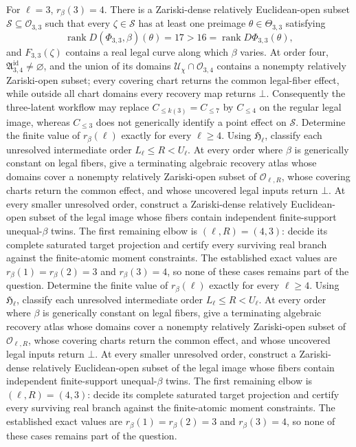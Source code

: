 For \(\ell=3\), \(r_\beta(3)=4\).  There is a Zariski-dense relatively Euclidean-open subset \(\mathcal S\subseteq\mathcal O_{3,3}\) such that every \(\zeta\in\mathcal S\) has at least one preimage \(\theta\in\Theta_{3,3}\) satisfying
\[
 \operatorname{rank}D(\Phi_{3,3},\beta)(\theta)=17
 >16=\operatorname{rank}D\Phi_{3,3}(\theta),
\]
and \(F_{3,3}(\zeta)\) contains a real legal curve along which \(\beta\) varies.  At order four, \(\mathfrak A^{\mathrm{id}}_{3,4}\ne\varnothing\), and the union of its domains \(\mathcal U_\chi\cap\mathcal O_{3,4}\) contains a nonempty relatively Zariski-open subset; every covering chart returns the common legal-fiber effect, while outside all chart domains every recovery map returns \(\bot\).  Consequently the three-latent workflow may replace \(C_{\le k(3)}=C_{\le7}\) by \(C_{\le4}\) on the regular legal image, whereas \(C_{\le3}\) does not generically identify a point effect on \(\mathcal S\).
Determine the finite value of \(r_\beta(\ell)\) exactly for every \(\ell\ge4\).  Using \(\mathfrak H_{\ell}\), classify each unresolved intermediate order \(L_\ell\le R<U_\ell\).  At every order where \(\beta\) is generically constant on legal fibers, give a terminating algebraic recovery atlas whose domains cover a nonempty relatively Zariski-open subset of \(\mathcal O_{\ell,R}\), whose covering charts return the common effect, and whose uncovered legal inputs return \(\bot\).  At every smaller unresolved order, construct a Zariski-dense relatively Euclidean-open subset of the legal image whose fibers contain independent finite-support unequal-\(\beta\) twins.  The first remaining elbow is \((\ell,R)=(4,3)\): decide its complete saturated target projection and certify every surviving real branch against the finite-atomic moment constraints.  The established exact values are \(r_\beta(1)=r_\beta(2)=3\) and \(r_\beta(3)=4\), so none of these cases remains part of the question.
Determine the finite value of \(r_\beta(\ell)\) exactly for every \(\ell\ge4\).  Using \(\mathfrak H_{\ell}\), classify each unresolved intermediate order \(L_\ell\le R<U_\ell\).  At every order where \(\beta\) is generically constant on legal fibers, give a terminating algebraic recovery atlas whose domains cover a nonempty relatively Zariski-open subset of \(\mathcal O_{\ell,R}\), whose covering charts return the common effect, and whose uncovered legal inputs return \(\bot\).  At every smaller unresolved order, construct a Zariski-dense relatively Euclidean-open subset of the legal image whose fibers contain independent finite-support unequal-\(\beta\) twins.  The first remaining elbow is \((\ell,R)=(4,3)\): decide its complete saturated target projection and certify every surviving real branch against the finite-atomic moment constraints.  The established exact values are \(r_\beta(1)=r_\beta(2)=3\) and \(r_\beta(3)=4\), so none of these cases remains part of the question.

